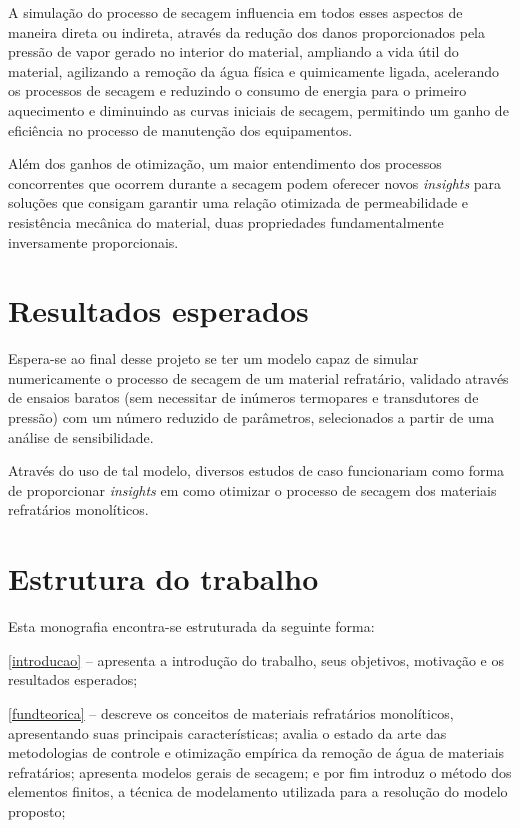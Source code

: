    A simulação do processo de secagem influencia em todos esses aspectos de
   maneira direta ou indireta, através da redução dos danos proporcionados pela
   pressão de vapor gerado no interior do material, ampliando a vida útil do
   material, agilizando a remoção da água física e quimicamente ligada, acelerando os processos de secagem e reduzindo o consumo de energia para o
   primeiro aquecimento e diminuindo as curvas iniciais de secagem, permitindo
   um ganho de eficiência no processo de manutenção dos equipamentos.

   Além dos ganhos de otimização, um maior entendimento dos processos
   concorrentes que ocorrem durante a secagem podem oferecer novos \textit{insights} para
   soluções que consigam garantir uma relação otimizada de permeabilidade e
   resistência mecânica do material, duas propriedades fundamentalmente
   inversamente proporcionais.


\section{Resultados esperados} \label{results-esperados}
   Espera-se ao final desse projeto se ter um modelo capaz de simular
   numericamente o processo de secagem de um material refratário, validado
   através de ensaios baratos (sem necessitar de inúmeros termopares e transdutores de
   pressão) com um número reduzido de parâmetros, selecionados a partir de uma
   análise de sensibilidade.

   Através do uso de tal modelo, diversos estudos de caso funcionariam como
   forma de proporcionar \textit{insights} em como otimizar o processo de secagem dos
   materiais refratários monolíticos.

    
\section{Estrutura do trabalho}
    
Esta monografia encontra-se estruturada da seguinte forma:
    
\autoref{introducao} – apresenta a introdução do trabalho, seus objetivos, motivação e os resultados esperados;
    
\autoref{fundteorica} – descreve os conceitos de materiais refratários monolíticos, apresentando suas principais características; avalia o estado da arte das metodologias de controle e otimização empírica da remoção de água de materiais refratários; apresenta modelos gerais de secagem; e por fim introduz o método dos elementos finitos, a técnica de modelamento utilizada para a resolução do modelo proposto;
    
